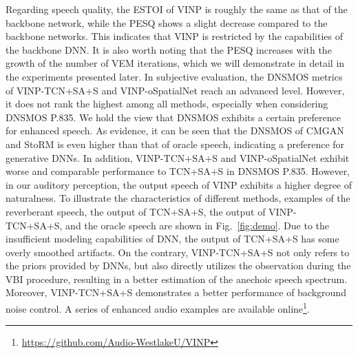 Regarding speech quality, the ESTOI of VINP is roughly the same as that of the backbone network, while the PESQ shows a slight decrease compared to the backbone networks.
This indicates that VINP is restricted by the capabilities of the backbone DNN. 
It is also worth noting that the PESQ increases with the growth of the number of VEM iterations, which we will demonstrate in detail in the experiments presented later.
In subjective evaluation, the DNSMOS metrics of VINP-TCN+SA+S and VINP-oSpatialNet reach an advanced level.
However, it does not rank the highest among all methods, especially when considering DNSMOS P.835.
We hold the view that DNSMOS exhibits a certain preference for enhanced speech.
As evidence, it can be seen that the DNSMOS of CMGAN and StoRM is even higher than that of oracle speech, indicating a preference for generative DNNs.
In addition, VINP-TCN+SA+S and VINP-oSpatialNet exhibit worse and comparable performance to TCN+SA+S in DNSMOS P.835.
However, in our auditory perception, the output speech of VINP exhibits a higher degree of naturalness.
To illustrate the characteristics of different methods, examples of the reverberant speech, the output of TCN+SA+S, the output of VINP-TCN+SA+S, and the oracle speech are shown in Fig.~\ref{fig:demo}.
Due to the insufficient modeling capabilities of DNN, the output of TCN+SA+S has some overly smoothed artifacts.
On the contrary, VINP-TCN+SA+S not only refers to the priors provided by DNNs, but also directly utilizes the observation during the VBI procedure, resulting in a better estimation of the anechoic speech spectrum.
Moreover, VINP-TCN+SA+S demonstrates a better performance of background noise control.
A series of enhanced audio examples are available online\footnote{\url{https://github.com/Audio-WestlakeU/VINP}}.


